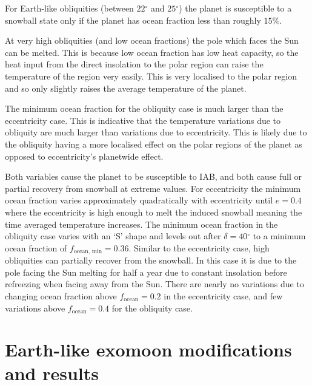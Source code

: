 \documentclass[12pt, onecolumn]{revtex4-2}    %
\newcommand{\degrees}{\ensuremath{^{\circ}}}
\begin{document}
For Earth-like obliquities (between $22\degrees$ and $25\degrees$) the planet is susceptible to a snowball state only if the planet has ocean fraction less than roughly $15\%$.

At very high obliquities (and low ocean fractions) the pole which faces the Sun can be melted.
This is because low ocean fraction has low heat capacity, so the heat input from the direct insolation to the polar region can raise the temperature of the region very easily.
This is very localised to the polar region and so only slightly raises the average temperature of the planet.

The minimum ocean fraction for the obliquity case is much larger than the eccentricity case.
This is indicative that the temperature variations due to obliquity are much larger than variations due to eccentricity.
This is likely due to the obliquity having a more localised effect on the polar regions of the planet as opposed to eccentricity's planetwide effect.

Both variables cause the planet to be susceptible to IAB, and both cause full or partial recovery from snowball at extreme values.
For eccentricity the minimum ocean fraction varies approximately quadratically with eccentricity until $e = 0.4$ where the eccentricity is high enough to melt the induced snowball meaning the time averaged temperature increases.
The minimum ocean fraction in the obliquity case varies with an `S' shape and levels out after $\delta = 40\degrees$ to a minimum ocean fraction of $f_\text{ocean, min} = 0.36$.
Similar to the eccentricity case, high obliquities can partially recover from the snowball. In this case it is due to the pole facing the Sun melting for half a year due to constant insolation before refreezing when facing away from the Sun.
There are nearly no variations due to changing ocean fraction above $f_\text{ocean} = 0.2$ in the eccentricity case, and few variations above $f_\text{ocean} = 0.4$ for the obliquity case.

\section{Earth-like exomoon modifications and results} \label{sec:Exomoons}
%
\end{document}
